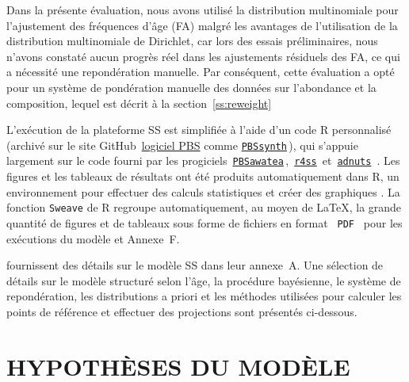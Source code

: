 \documentclass[11pt]{book}
\newcommand{\angL}{\guillemotleft\,}
\newcommand{\angR}{\,\guillemotright}
\newcommand{\code}[1]{\normalsize\texttt{#1}\normalsize}%
\newcommand{\AppRes}{Annexe~F}
\begin{document}
Dans la pr\'{e}sente \'{e}valuation, nous avons utilis\'{e} la distribution multinomiale pour l'ajustement des fr\'{e}quences d'\^{a}ge (FA) malgr\'{e} les avantages de l'utilisation de la distribution multinomiale de Dirichlet, car lors des essais pr\'{e}liminaires, nous n'avons constat\'{e} aucun progr\`{e}s r\'{e}el dans les ajustements r\'{e}siduels des FA, ce qui a n\'{e}cessit\'{e} une repond\'{e}ration manuelle.
Par cons\'{e}quent, cette \'{e}valuation a opt\'{e} pour un syst\`{e}me de pond\'{e}ration manuelle des donn\'{e}es sur l'abondance et la composition, lequel est d\'{e}crit \`{a} la section~\ref{ss:reweight}%

L'ex\'{e}cution de la plateforme SS est simplifi\'{e}e \`{a} l'aide d'un code R personnalis\'{e} (archiv\'{e} sur le site GitHub \angL \href{https://github.com/pbs-software}{logiciel PBS} comme \href{https://github.com/pbs-software/pbs-synth}{\code{PBSsynth}}\angR{}), qui s'appuie largement sur le code fourni par les progiciels \angL \href{https://github.com/pbs-software/pbs-awatea}{\code{PBSawatea}}\angR{}, \angL \href{https://github.com/r4ss/r4ss}{\code{r4ss}}\angR{} \citep{R:2020_r4ss} et \angL \href{https://github.com/Cole-Monnahan-NOAA/adnuts}{\code{adnuts}}\angR{} \citep{R:2018_adnuts}.
Les figures et les tableaux de r\'{e}sultats ont \'{e}t\'{e} produits automatiquement dans R, un environnement pour effectuer des calculs statistiques et cr\'{e}er des graphiques \citep{R:2021_base}.
La fonction \code{Sweave} de R \citep{Leisch:2002} regroupe automatiquement, au moyen de \LaTeX, la grande quantit\'{e} de figures et de tableaux sous forme de fichiers en format \code{\angL PDF\angR{}} pour les ex\'{e}cutions du mod\`{e}le et \AppRes.

\citet{Methot-Wetzel:2013} fournissent des d\'{e}tails sur le mod\`{e}le SS dans leur annexe~A.
Une s\'{e}lection de d\'{e}tails sur le mod\`{e}le structur\'{e} selon l'\^{a}ge, la proc\'{e}dure bay\'{e}sienne, le syst\`{e}me de repond\'{e}ration, les distributions a priori et les m\'{e}thodes utilis\'{e}es pour calculer les points de r\'{e}f\'{e}rence et effectuer des projections sont pr\'{e}sent\'{e}s ci-dessous.

\section{HYPOTH\`{E}SES DU MOD\`{E}LE}
\end{document}
